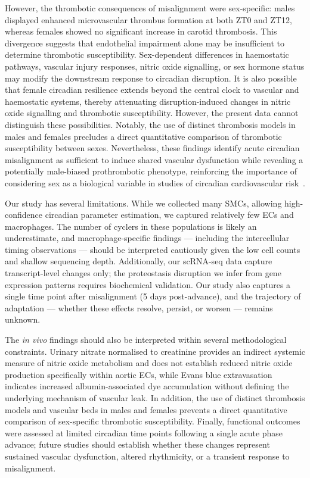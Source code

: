 \documentclass[12pt]{article}
\begin{document}
However, the thrombotic consequences of misalignment were sex-specific: males displayed
enhanced microvascular thrombus formation at both ZT0 and ZT12, whereas females showed
no significant increase in carotid thrombosis. This divergence suggests that endothelial impairment alone may be insufficient to determine thrombotic susceptibility. 
Sex-dependent differences in haemostatic pathways, vascular injury responses, nitric oxide signalling, or sex hormone status may modify the downstream response to circadian disruption. 
It is also possible that female circadian resilience extends beyond the central clock to vascular and haemostatic systems, thereby attenuating disruption-induced changes in nitric oxide signalling and thrombotic susceptibility. 
However, the present data cannot distinguish these possibilities.
Notably, the use of distinct thrombosis models in males and females precludes a direct
quantitative comparison of thrombotic susceptibility between sexes.
Nevertheless, these findings identify acute circadian misalignment as sufficient to induce shared
vascular dysfunction while revealing a potentially male-biased prothrombotic phenotype,
reinforcing the importance of considering sex as a biological variable in studies of circadian
cardiovascular risk~\cite{ref138,ref139}.

Our study has several limitations. While we collected many SMCs, allowing high-confidence circadian
parameter estimation, we captured relatively few ECs and macrophages. The number of
cyclers in these populations is likely an underestimate, and macrophage-specific findings ---
including the intercellular timing observations --- should be interpreted cautiously given the low
cell counts and shallow sequencing depth. Additionally, our scRNA-seq data capture transcript-level
changes only; the proteostasis disruption we infer from gene expression patterns requires
biochemical validation. Our study also captures a single time point after misalignment (5 days
post-advance), and the trajectory of adaptation --- whether these effects resolve, persist, or
worsen --- remains unknown.

The \textit{in vivo} findings should also be interpreted within several methodological constraints.
Urinary nitrate normalised to creatinine provides an indirect systemic measure of nitric oxide
metabolism and does not establish reduced nitric oxide production specifically within aortic ECs,
while Evans blue extravasation indicates increased albumin-associated dye accumulation
without defining the underlying mechanism of vascular leak. In addition, the use of distinct
thrombosis models and vascular beds in males and females prevents a direct quantitative
comparison of sex-specific thrombotic susceptibility. Finally, functional outcomes were assessed at limited circadian time points following a single acute phase advance; future studies should
establish whether these changes represent sustained vascular dysfunction, altered rhythmicity,
or a transient response to misalignment.
 
\end{document}
